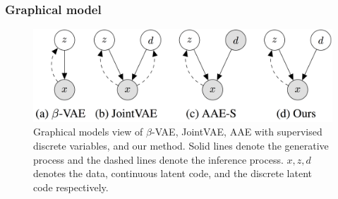 \documentclass[10pt,mathserif]{beamer}
\begin{document}
\begin{frame}
\begin{figure}
%
\end{figure}
\begin{itemize}
\end{itemize}
\end{frame} 

\begin{frame}
\frametitle{Graphical model}
\begin{figure}[bp]
\centering
\includegraphics[width=1.0\linewidth]{graphical_model.png}
\caption{Graphical models view of $\beta$-VAE, JointVAE, AAE with supervised discrete variables, and our method. Solid lines denote the generative process and the dashed lines denote the inference process. $x,z,d$ denotes the data, continuous latent code, and the discrete latent code respectively.}
\end{figure}
\end{frame} 
\end{document}
